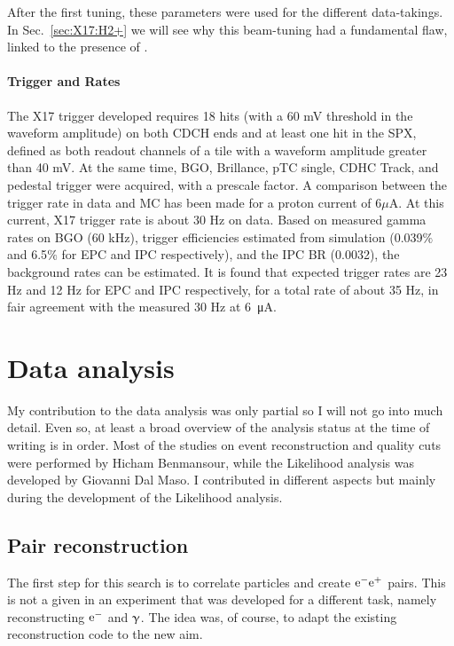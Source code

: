 \begin{refsection}
        \noindent
        After the first tuning, these parameters were used for the different data-takings. 
        In Sec.~\ref{sec:X17:H2+} we will see why this beam-tuning had a fundamental flaw, linked to the presence of .


        \paragraph{Trigger and Rates}
        The X17 trigger developed requires 18 hits (with a 60 mV threshold in the waveform amplitude) on both CDCH ends and at least one hit in the SPX, defined as both readout channels of a tile with a waveform amplitude greater than 40 mV. 
        At the same time, BGO, Brillance, pTC single, CDHC Track, and pedestal trigger were acquired, with a prescale factor.
        A comparison between the trigger rate in data and MC has been made for a proton current of 6$\mu$A. 
        At this current, X17 trigger rate is about 30 Hz on data.
        Based on measured gamma rates on BGO (60 kHz), trigger efficiencies estimated from simulation (0.039$\%$ and 6.5$\%$ for EPC and IPC respectively), and the IPC BR (0.0032), the background rates can be estimated. 
        It is found that expected trigger rates are 23 Hz and 12 Hz for EPC and IPC respectively, for a total rate of about 35 Hz, in fair agreement with the measured 30 Hz at \SI{6}{\micro\ampere}.
        
\section{Data analysis}
    My contribution to the data analysis was only partial so I will not go into much detail. 
    Even so, at least a broad overview of the analysis status at the time of writing is in order.
    Most of the studies on event reconstruction and quality cuts were performed by Hicham Benmansour, while the Likelihood analysis was developed by Giovanni Dal Maso. 
    I contributed in different aspects but mainly during the development of the Likelihood analysis.

    \subsection{Pair reconstruction}
        The first step for this search is to correlate particles and create $\text{e}^- \text{e}^+$ pairs. 
        This is not a given in an experiment that was developed for a different task, namely reconstructing $\text{e}^-$ and $\upgamma$. 
        The idea was, of course, to adapt the existing reconstruction code to the new aim.
        

\end{refsection}
